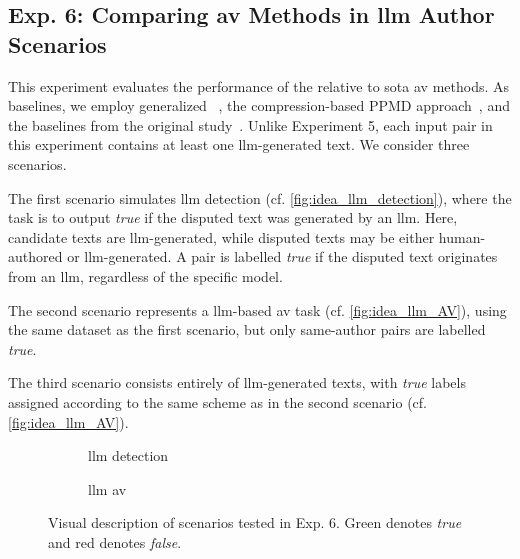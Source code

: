 \subsection{Exp. 6: Comparing \ac{av} Methods in \acs{llm} Author Scenarios}

This experiment evaluates the performance of the \impAppr{} relative to \acl{sota} \ac{av} methods. 
As baselines, we employ generalized \unmasking{}~\citep{bevendorff_generalizing_2019}, the compression-based PPMD approach~\citep{stamatatos_survey_2009}, and the baselines from the original \impAppr{} study~\citep{koppel_determining_2014}. 
Unlike Experiment 5, each input pair in this experiment contains at least one \ac{llm}-generated text. 
We consider three scenarios. 

The first scenario simulates \ac{llm} detection (cf. \autoref{fig:idea_llm_detection}), where the task is to output \textit{true} if the disputed text was generated by an \ac{llm}. 
Here, candidate texts are \ac{llm}-generated, while disputed texts may be either human-authored or \ac{llm}-generated. 
A pair is labelled \textit{true} if the disputed text originates from an \ac{llm}, regardless of the specific model. 

The second scenario represents a \ac{llm}-based \ac{av} task (cf. \autoref{fig:idea_llm_AV}), using the same dataset as the first scenario, but only same-author pairs are labelled \textit{true}. 

The third scenario consists entirely of \ac{llm}-generated texts, with \textit{true} labels assigned according to the same scheme as in the second scenario (cf. \autoref{fig:idea_llm_AV}). 

\begin{figure}[htbp]
  \centering
  \begin{subfigure}{0.45\textwidth}
    \centering
    
    \caption{\ac{llm} detection}
    \label{fig:idea_llm_detection}
  \end{subfigure}
  \hfill
  \begin{subfigure}{0.45\textwidth}
    \centering
    
    \caption{\ac{llm} \ac{av}}
    \label{fig:idea_llm_AV}
  \end{subfigure}
  \caption{Visual description of scenarios tested in Exp. 6.
  Green denotes \textit{true} and red denotes \textit{false}.
  }
  \label{fig:ideas_exp6}
\end{figure}

